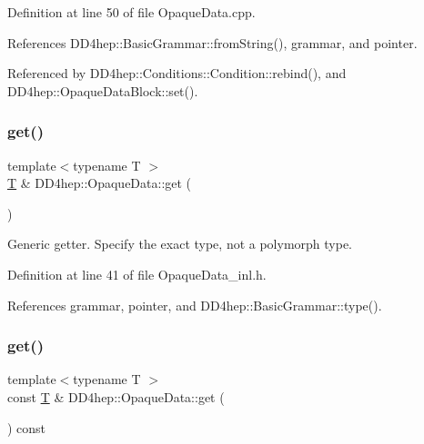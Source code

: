 Definition at line 50 of file Opaque\+Data.\+cpp.



References D\+D4hep\+::\+Basic\+Grammar\+::from\+String(), grammar, and pointer.



Referenced by D\+D4hep\+::\+Conditions\+::\+Condition\+::rebind(), and D\+D4hep\+::\+Opaque\+Data\+Block\+::set().

\hypertarget{class_d_d4hep_1_1_opaque_data_aae8619e3b068708a4d4d0ffa09cdd22b}{}\label{class_d_d4hep_1_1_opaque_data_aae8619e3b068708a4d4d0ffa09cdd22b} 
\subsubsection{\texorpdfstring{get()}{get()}\hspace{0.1cm}{\footnotesize\ttfamily [1/2]}}
{\footnotesize\ttfamily template$<$typename T $>$ \\
\hyperlink{class_t}{T} \& D\+D4hep\+::\+Opaque\+Data\+::get (\begin{DoxyParamCaption}{ }\end{DoxyParamCaption})}



Generic getter. Specify the exact type, not a polymorph type. 



Definition at line 41 of file Opaque\+Data\+\_\+inl.\+h.



References grammar, pointer, and D\+D4hep\+::\+Basic\+Grammar\+::type().

\hypertarget{class_d_d4hep_1_1_opaque_data_a889d6d26bf44ed29ea08d084d8cf7d24}{}\label{class_d_d4hep_1_1_opaque_data_a889d6d26bf44ed29ea08d084d8cf7d24} 
\subsubsection{\texorpdfstring{get()}{get()}\hspace{0.1cm}{\footnotesize\ttfamily [2/2]}}
{\footnotesize\ttfamily template$<$typename T $>$ \\
const \hyperlink{class_t}{T} \& D\+D4hep\+::\+Opaque\+Data\+::get (\begin{DoxyParamCaption}{ }\end{DoxyParamCaption}) const}



